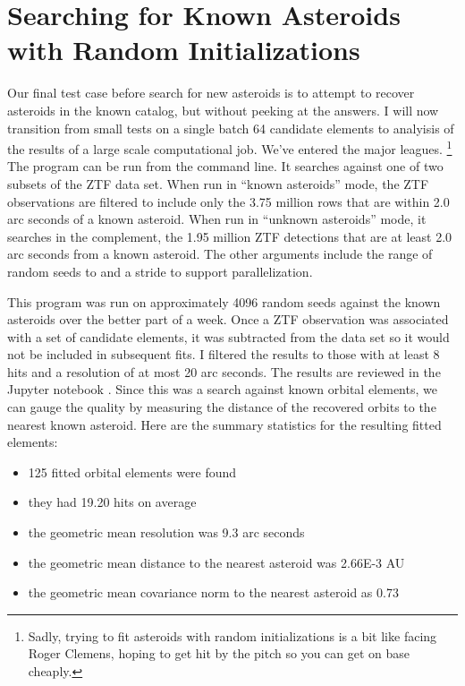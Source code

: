 \section{Searching for Known Asteroids with Random Initializations}
\label{section_results_known_ast_random}
Our final test case before search for new asteroids is to attempt to recover asteroids in the known catalog, but without peeking at the answers.
I will now transition from small tests on a single batch 64 candidate elements to analyisis of the results of a large scale computational job.
We've entered the major leagues.
\footnote{Sadly, trying to fit asteroids with random initializations is a bit like facing Roger Clemens,
hoping to get hit by the pitch so you can get on base cheaply.}
The program  can be run from the command line.
It searches against one of two subsets of the ZTF data set.
When run in ``known asteroids'' mode, the ZTF observations are filtered to include only the 3.75 million rows that are within 2.0 arc seconds of a known asteroid.
When run in ``unknown asteroids'' mode, it searches in the complement, the 1.95 million ZTF detections that are at least 2.0 arc seconds from a known asteroid.
The other arguments include the range of random seeds  to  and a stride to support parallelization.

This program was run on approximately 4096 random seeds against the known asteroids over the better part of a week.
Once a ZTF observation was associated with a set of candidate elements, it was subtracted from the data set so it would not be included in subsequent fits.
I filtered the results to those with at least 8 hits and a resolution of at most 20 arc seconds.
The results are reviewed in the Jupyter notebook .
Since this was a search against known orbital elements, 
we can gauge the quality by measuring the distance of the recovered orbits to the nearest known asteroid.
Here are the summary statistics for the resulting fitted elements:
\begin{itemize}
\item 125 fitted orbital elements were found
\item they had 19.20 hits on average
\item the geometric mean resolution was 9.3 arc seconds
\item the geometric mean distance to the nearest asteroid was 2.66E-3 AU
\item the geometric mean covariance norm to the nearest asteroid as 0.73
\end{itemize}


